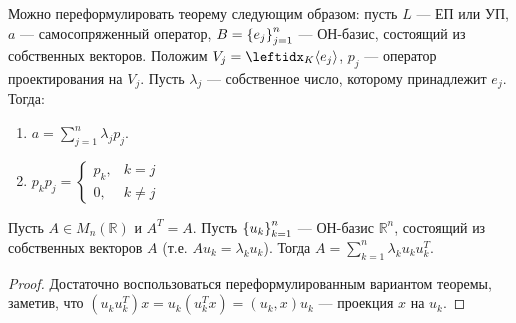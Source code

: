 \begin{rem}
    Можно переформулировать теорему следующим образом: пусть $L$ --- ЕП или УП, $a$ --- самосопряженный оператор, $B = \left\{e_j\right\}_{j=1}^{n}$ --- ОН-базис, состоящий из собственных векторов. Положим $V_j = \gen{K}{e_j}$, $p_j$ --- оператор проектирования на $V_j$. Пусть $\lambda_j$ --- собственное число, которому принадлежит $e_j$. Тогда:
    \begin{enumerate}
        \item $a = \sum_{j=1}^n \lambda_j p_j$.
        \item $p_k p_j = \begin{cases}
            p_k, & k = j \\
            0,   & k \neq j
        \end{cases}$
    \end{enumerate}
\end{rem}

\begin{cor*}
    Пусть $A \in M_n(\mathbb{R})$ и $A^T = A$. Пусть $\left\{u_k\right\}_{k=1}^{n}$ --- ОН-базис $\mathbb{R}^n$, состоящий из собственных векторов $A$ (т.е. $Au_k = \lambda_k u_k$). Тогда $A = \sum_{k=1}^n \lambda_k u_k u_k^T$.
\end{cor*}

\begin{proof}
    Достаточно воспользоваться переформулированным вариантом теоремы, заметив, что $(u_ku_k^T)x = u_k(u_k^Tx) = (u_k, x)u_k$ --- проекция $x$ на $u_k$.
\end{proof}